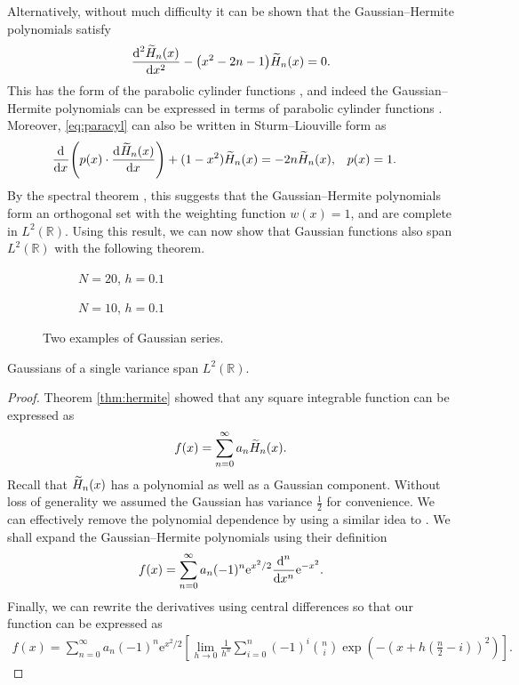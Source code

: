 Alternatively, without much difficulty it can be shown that the Gaussian--Hermite polynomials satisfy
\begin{align}
\label{eq:paracyl}
\diff[2]{\Her{n}{x}}{x} - \left( x^2 - 2n - 1 \right) \Her{n}{x} = 0.
\end{align}
This has the form of the parabolic cylinder functions \cite{miller}, and indeed the Gaussian--Hermite polynomials can be expressed in terms of parabolic cylinder functions \cite{hochstrasser, miller}. Moreover, \eqref{eq:paracyl} can also be written in Sturm--Liouville form as
\begin{align*}
\diff{}{x} \left( p(x) \cdot \diff{\Her{n}{x}}{x} \right) + (1 - x^2) \Her{n}{x} &= -2n \Her{n}{x}, & p(x) &= 1.
\end{align*}
By the spectral theorem \cite{griffel, higson, kreyszig}, this suggests that the Gaussian--Hermite polynomials form an orthogonal set with the weighting function $w(x) = 1$, and are complete in $L^2(\mathbb{R})$. Using this result, we can now show that Gaussian functions also span $L^2(\mathbb{R})$ with the following theorem. \\

\begin{figure}[tbp]
\begin{subfigure}{0.5\textwidth}

\caption{$N = 20$, $h = 0.1$}
\end{subfigure}
\begin{subfigure}{0.5\textwidth}

\caption{$N = 10$, $h = 0.1$}
\end{subfigure}
\caption{Two examples of Gaussian series.}
\label{fig:gs}
\end{figure}

\begin{theorem}
\label{thm:gaussian}
Gaussians of a single variance span $L^2(\mathbb{R})$.
\end{theorem}
\begin{proof}
Theorem \ref{thm:hermite} showed that any square integrable function can be expressed as
\begin{align*}
f(x) = \sum_{n = 0}^\infty a_n \Her{n}{x}.
\end{align*}
Recall that $\Her{n}{x}$ has a polynomial as well as a Gaussian component. Without loss of generality we assumed the Gaussian has variance $\frac{1}{2}$ for convenience. We can effectively remove the polynomial dependence by using a similar idea to \cite{calcaterra2, calcaterra}. We shall expand the Gaussian--Hermite polynomials using their definition
\begin{align*}
f(x) = \sum_{n = 0}^\infty a_n (-1)^n \textrm{e}^{x^2/2} \diff[n]{}{x} \textrm{e}^{-x^2}.
\end{align*}
Finally, we can rewrite the derivatives using central differences \cite{zwillinger} so that our function can be expressed as
\begin{align}
f(x) = \sum_{n = 0}^\infty a_n (-1)^n \textrm{e}^{x^2/2} \left[ \lim_{h \rightarrow 0} \frac{1}{h^n} \sum_{i = 0}^n (-1)^i \binom{n}{i} \exp\left( -\left( x + h\left( \frac{n}{2} - i \right) \right)^2 \right) \right].
\label{eq:gs}
\end{align}
\end{proof}

